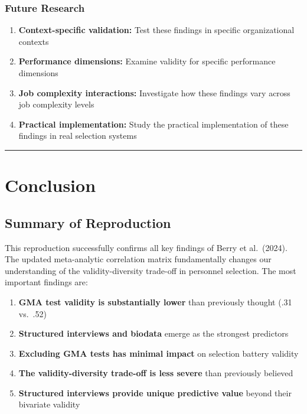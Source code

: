 \documentclass[
]{article}
\providecommand{\tightlist}{%
  \setlength{\itemsep}{0pt}\setlength{\parskip}{0pt}}
\begin{document}
\subsubsection{Future Research}\label{future-research}

\begin{enumerate}
\def\labelenumi{\arabic{enumi}.}
\tightlist
\item
  \textbf{Context-specific validation:} Test these findings in specific
  organizational contexts
\item
  \textbf{Performance dimensions:} Examine validity for specific
  performance dimensions
\item
  \textbf{Job complexity interactions:} Investigate how these findings
  vary across job complexity levels
\item
  \textbf{Practical implementation:} Study the practical implementation
  of these findings in real selection systems
\end{enumerate}

\begin{center}\rule{0.5\linewidth}{0.5pt}\end{center}

\section{Conclusion}\label{conclusion}

\subsection{Summary of Reproduction}\label{summary-of-reproduction}

This reproduction successfully confirms all key findings of Berry et
al.~(2024). The updated meta-analytic correlation matrix fundamentally
changes our understanding of the validity-diversity trade-off in
personnel selection. The most important findings are:

\begin{enumerate}
\def\labelenumi{\arabic{enumi}.}
\tightlist
\item
  \textbf{GMA test validity is substantially lower} than previously
  thought (.31 vs.~.52)
\item
  \textbf{Structured interviews and biodata} emerge as the strongest
  predictors
\item
  \textbf{Excluding GMA tests has minimal impact} on selection battery
  validity
\item
  \textbf{The validity-diversity trade-off is less severe} than
  previously believed
\item
  \textbf{Structured interviews provide unique predictive value} beyond
  their bivariate validity
\end{enumerate}
\end{document}
